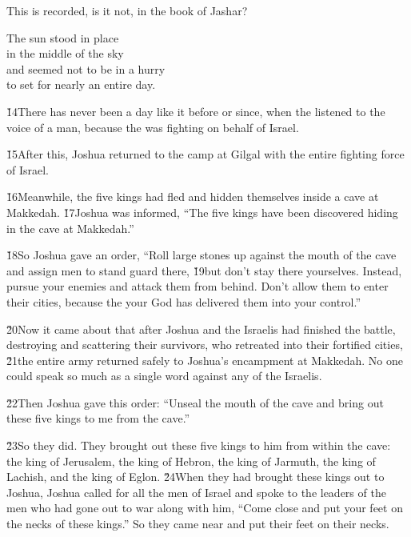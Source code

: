 This is recorded, is it not, in the book of Jashar?

\begin{poetry}
\poeml The sun stood in place \\
\poemll    in the middle of the sky \\
\poeml and seemed not to be in a hurry \\
\poemll    to set for nearly an entire day.
\end{poetry}

\v{14}There has never been a day like it before or since, when the  listened to the voice of a man, because the  was fighting on behalf of Israel.

\v{15}After this, Joshua returned to the camp at Gilgal with the entire fighting force of Israel.

\v{16}Meanwhile, the five kings had fled and hidden themselves inside a cave at Makkedah. \v{17}Joshua was informed, ``The five kings have been discovered hiding in the cave at Makkedah.''

\v{18}So Joshua gave an order, ``Roll large stones up against the mouth of the cave and assign men to stand guard there, \v{19}but don't stay there yourselves. Instead, pursue your enemies and attack them from behind. Don't allow them to enter their cities, because the  your God has delivered them into your control.''

\v{20}Now it came about that after Joshua and the Israelis had finished the battle, destroying and scattering their survivors, who retreated into their fortified cities, \v{21}the entire army returned safely to Joshua's encampment at Makkedah. No one could speak so much as a single word against any of the Israelis.

\v{22}Then Joshua gave this order: ``Unseal the mouth of the cave and bring out these five kings to me from the cave.''

\v{23}So they did. They brought out these five kings to him from within the cave: the king of Jerusalem, the king of Hebron, the king of Jarmuth, the king of Lachish, and the king of Eglon. \v{24}When they had brought these kings out to Joshua, Joshua called for all the men of Israel and spoke to the leaders of the men who had gone out to war along with him, ``Come close and put your feet on the necks of these kings.'' So they came near and put their feet on their necks.

